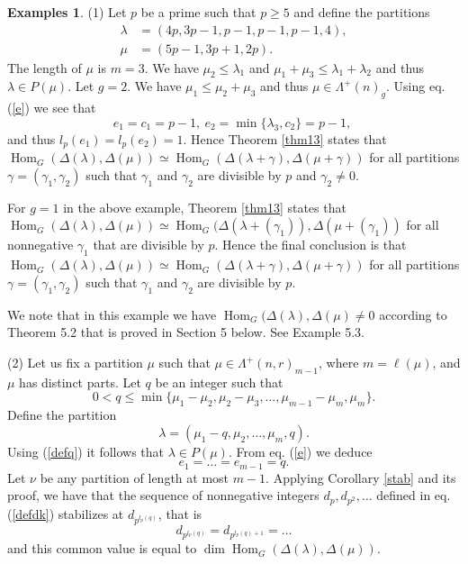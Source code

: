 \documentclass[11pt]{article}
\theoremstyle{definition}
\newtheorem{exams}[theo]{Examples}
\numberwithin{equation}{section}
\newcommand{\m}{\mu}
\newcommand{\la}{\lambda}
\newcommand{\La}{\Lambda}
\DeclareMathOperator{\Hom}{Hom}
\numberwithin{equation}{section}
\begin{document}
	\begin{exams}\label{rem14} (1) Let $p$ be a prime such that $p \ge 5$ and define the partitions \begin{align*}\lambda&=(4p, 3p-1, p-1, p-1, p-1, 4), \\ \mu &=(5p-1, 3p+1, 2p). \end{align*} The length of $\mu$ is $m=3$.  We have $\mu_2 \le \lambda_1$ and $\mu_1+\mu_3 \le \lambda_1 + \lambda_2$ and thus $\lambda \in P(\mu)$. Let $g=2$. We have $\mu_1 \le \mu_2+\mu_3$ and thus $\mu \in \La^+(n)_g$. Using eq. (\ref{e}) we see that \[
			e_1 = c_1=p-1, \ e_2 = \min\{\lambda_3, c_2\}=p-1,\  
			\]
	and thus $l_p(e_1)=l_p(e_2)=1$. Hence Theorem \ref{thm13} states that $\Hom_G(\Delta(\la),\Delta(\mu)) \simeq \Hom_{G}(\Delta(\la+\gamma), \Delta(\mu+\gamma))$ for all partitions $\gamma=(\gamma_1, \gamma_2)$ such that $\gamma_1$ and $\gamma_2$ are divisible by $p$ and $\gamma_2 \neq 0$.
	
	For $g=1$ in the above example, Theorem \ref{thm13} states that $\Hom_G(\Delta(\la),\Delta(\mu)) \simeq \Hom_{G}(\Delta(\la+(\gamma_1)), \Delta(\mu+(\gamma_1))$ for all nonnegative $\gamma_1$ that are divisible by $p$. Hence the final conclusion is that $\Hom_G(\Delta(\la),\Delta(\mu)) \simeq \Hom_{G}(\Delta(\la+\gamma), \Delta(\mu+\gamma))$ for all partitions $\gamma=(\gamma_1, \gamma_2)$ such that $\gamma_1$ and $\gamma_2$ are divisible by $p$.
	
	We note that in this example we have  $\Hom_{G}(\Delta(\la), \Delta(\mu) \neq 0$ according to Theorem 5.2 that is proved in Section 5 below. See Example 5.3.
	
	(2)	Let us fix a partition $\mu$ such that $\mu \in \La^+(n,r)_{m-1}$, 	where $m=\ell{(\mu) }$, and $\mu$ has distinct parts. Let $q$ be an integer such that \begin{equation}\label{defq}0 < q \le \min\{\mu_1 - \mu_2, \mu_2 - \mu_3, \dots, \mu_{m-1} - \mu_{m}, \mu_{m}\}.\end{equation}
	Define the partition \begin{equation}\label{deflambda}\lambda =(\m_1-q,\mu_2, \dots, \mu_m, q).\end{equation} Using (\ref{defq}) it follows that $\lambda \in P(\mu)$. From eq. (\ref{e}) we deduce \[e_1 = \dots = e_{m-1}=q.\]
	Let $\nu$ be any partition of length at most $m-1$. Applying Corollary \ref{stab} and its proof, we have that the sequence of nonnegative integers $d_p, d_{p^2}, \dots$ defined in eq. (\ref{defdk}) stabilizes at $\label{eqd}d_{p^{l_p(q)}}$, that is \begin{equation}d_{p^{l_p(q)}} = d_{p^{l_p(q)+1}}= \dots \end{equation}
	and this common value is equal to $\dim \Hom_G(\Delta(\la),\Delta(\mu)).$
	

\end{exams}
\end{document}
